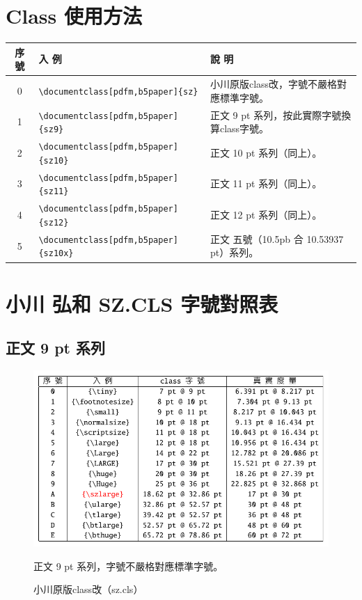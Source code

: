 \section{Class 使用方法}

\begin{table}[H]
	\begin{center}
{\fontsize{10pt}{12}\selectfont\ttfamily
\begin{tabular}{|c|p{70mm}|p{75mm}|}
 \hline%
{序 號} & {入 例} & {說 明} \\ \hline %
0 & \verb+\documentclass[pdfm,b5paper]{sz}+ & 小川原版class改，字號不嚴格對應標準字號。\\
1 & \verb+\documentclass[pdfm,b5paper]{sz9}+ & 正文 9 pt 系列，按此實際字號換算class字號。\\
2 & \verb+\documentclass[pdfm,b5paper]{sz10}+ & 正文 10 pt 系列（同上）。\\
3 & \verb+\documentclass[pdfm,b5paper]{sz11}+ & 正文 11 pt 系列（同上）。\\
4 & \verb+\documentclass[pdfm,b5paper]{sz12}+ & 正文 12 pt 系列（同上）。\\
5 & \verb+\documentclass[pdfm,b5paper]{sz10x}+ & 正文 五號（10.5pb 合 10.53937 pt）系列。\\
\hline%
\end{tabular} }
	\end{center}
\end{table}

\section{小川 弘和 SZ.CLS 字號對照表}\label{sec:intro}

\subsection{正文 9 pt 系列}
\begin{figure}[H]
\begin{center}
\caption{小川原版class改（sz.cls）}
{ \includegraphics[scale=1]{figures/sz.pdf}}
\end{center}
\par 正文 9 pt 系列，字號不嚴格對應標準字號。
\end{figure}


